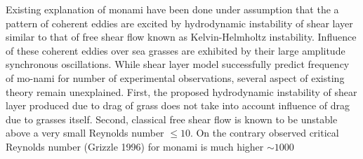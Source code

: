 \documentclass[aps,twocolumn,floatfix,prl,10pt]{revtex4-1}
\begin{document}
Existing explanation of monami have been done under assumption that the a pattern of coherent eddies are excited by hydrodynamic instability of shear layer
similar to that of free shear flow known as Kelvin-Helmholtz instability. Influence of these coherent eddies over sea grasses are exhibited by their large amplitude synchronous 
oscillations.
\newline
While shear layer model successfully predict frequency of mo-nami for number of experimental observations,
several aspect of existing theory remain unexplained. First, the proposed hydrodynamic instability of shear layer produced due to drag of 
grass does not take into account influence of drag due to grasses itself. 
Second, classical free shear flow is known to be unstable above a very small Reynolds number $\leq 10 $. On the contrary observed critical Reynolds number (Grizzle 1996) for monami is much
higher $\sim 1000$
\end{document}
